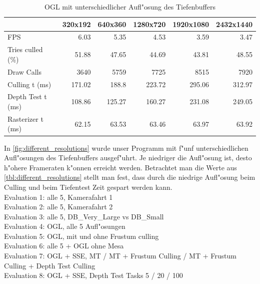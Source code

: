 \documentclass[journal]{vgtc}
\begin{document}
\begin{table}
	\begin{tabular}{| l | r | r | r | r | r |}
		\hline
		& 320x192   & 640x360   & 1280x720  & 1920x1080 & 2432x1440 \\ \hline
		FPS                & 6.03      & 5.35      & 4.53      & 3.59      & 3.47      \\ \hline
		Tries culled (\%)  & 51.88     & 47.65     & 44.69     & 43.81     & 48.55     \\ \hline
		Draw Calls         & 3640      & 5759      & 7725      & 8515      & 7920      \\ \hline
		Culling t (ms)     & 171.02    & 188.8     & 223.72    & 295.06    & 312.97    \\ \hline
		Depth Test t (ms)  & 108.86    & 125.27    & 160.27    & 231.08    & 249.05    \\ \hline
		Rasterizer t (ms)  & 62.15     & 63.53     & 63.46     & 63.97     & 63.92     \\
		\hline
	\end{tabular}
	\caption{OGL mit unterschiedlicher Aufl"osung des Tiefenbuffers}
	\label{tbl:different_resolutions}
\end{table}

In \autoref{fig:different_resolutions} wurde unser Programm mit f"unf unterschiedlichen Aufl"osungen des Tiefenbuffers ausgef"uhrt.
Je niedriger die Aufl"osung ist, desto h"ohere Frameraten k"onnen erreicht werden.
Betrachtet man die Werte aus \autoref{tbl:different_resolutions} stellt man fest, dass durch die niedrige Aufl"osung  beim Culling und beim Tiefentest Zeit gespart werden kann.\\


Evaluation 1: alle 5, Kamerafahrt 1\\
Evaluation 2: alle 5, Kamerafahrt 2\\
Evaluation 3: alle 5, DB\_Very\_Large vs DB\_Small\\
Evaluation 4: OGL, alle 5 Aufl"osungen\\
Evaluation 5: OGL, mit und ohne Frustum culling\\
Evaluation 6: alle 5 + OGL ohne Mesa\\
Evaluation 7: OGL + SSE, MT / MT + Frustum Culling / MT + Frustum Culling + Depth Test Culling\\
Evaluation 8: OGL + SSE, Depth Test Tasks 5 / 20 / 100
\end{document}
